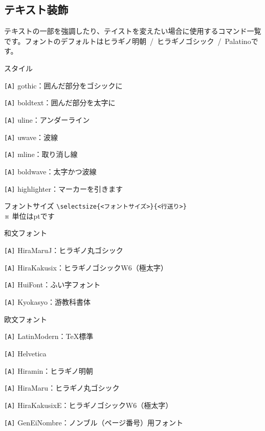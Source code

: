 \begin{multicols*}{2}
\section{テキスト装飾}
テキストの一部を強調したり、テイストを変えたい場合に使用するコマンド一覧です。フォントのデフォルトはヒラギノ明朝~/~ヒラギノゴシック~/~Palatinoです。
\begin{framebox-simple}{スタイル}
    \begin{reitemize}
        \item \verb|[A]| gothic：囲んだ部分をゴシックに
        \item \verb|[A]| boldtext：囲んだ部分を太字に
        \item \verb|[A]| uline：アンダーライン
        \item \verb|[A]| uwave：波線
        \item \verb|[A]| mline：取り消し線
        \item \verb|[A]| boldwave：太字かつ波線
        \item \verb|[A]| highlighter：マーカーを引きます
    \end{reitemize}
\end{framebox-simple}
\begin{framebox-simple}{フォントサイズ}
\verb|\selectsize{<フォントサイズ>}{<行送り>}|\\

\noindent ※ 単位はptです
\end{framebox-simple}
\begin{framebox-simple}{和文フォント}
    \begin{reitemize}
        \item \verb|[A]| HiraMaruJ：ヒラギノ丸ゴシック
        \item \verb|[A]| HiraKakusix：ヒラギノゴシックW6（極太字）
        \item \verb|[A]| HuiFont：ふい字フォント
        \item \verb|[A]| Kyokasyo：游教科書体
    \end{reitemize}
\end{framebox-simple}
\begin{framebox-simple}{欧文フォント}
    \begin{reitemize}
        \item \verb|[A]| LatinModern：\TeX 標準
        \item \verb|[A]| Helvetica
        \item \verb|[A]| Hiramin：ヒラギノ明朝
        \item \verb|[A]| HiraMaru：ヒラギノ丸ゴシック
        \item \verb|[A]| HiraKakusixE：ヒラギノゴシックW6（極太字）
        \item \verb|[A]| GenEiNombre：ノンブル（ページ番号）用フォント
    \end{reitemize}
\end{framebox-simple}


\end{multicols*}
